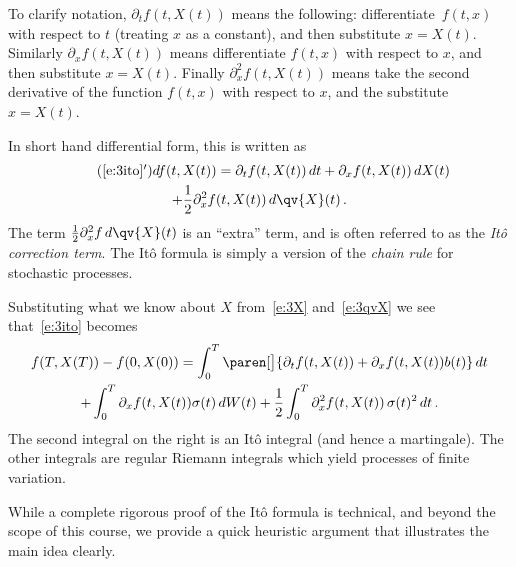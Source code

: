 \begin{remark}
  To clarify notation, $\partial_t f( t, X(t))$ means the following: differentiate~$f(t, x)$ with respect to $t$ (treating $x$ as a constant), and then substitute $x = X(t)$.
  Similarly $\partial_x f( t, X(t))$ means differentiate $f(t, x)$ with respect to $x$, and then substitute $x = X(t)$.
  Finally $\partial_x^2 f(t, X(t))$ means take the second derivative of the function $f(t, x)$ with respect to $x$, and the substitute $x = X(t)$.
\end{remark}
\begin{remark}
  In short hand differential form, this is written as
  \begin{multline}\label{e:3itoD}
    \tag{\ref{e:3ito}$'$}
    df(t, X(t)) = \partial_t f(t, X(t)) \, dt + \partial_x f(t, X(t)) \, dX(t)
    \\
      + \frac{1}{2} \partial_x^2 f(t, X(t)) \, d\qv{X}(t)\,.
  \end{multline}
  The term $\frac{1}{2} \partial_x^2 f \, d\qv{X}(t)$ is an ``extra'' term, and is often referred to as the \emph{It\^o correction term}.
  The It\^o formula is simply a version of the \emph{chain rule} for stochastic processes.
\end{remark}

\begin{remark}
  Substituting what we know about $X$ from~\eqref{e:3X} and~\eqref{e:3qvX} we see that~\eqref{e:3ito} becomes
  \begin{multline*}
    f(T, X(T)) - f(0, X(0))
      = \int_0^T \paren[\big]{ \partial_t f( t, X(t) )
	+ \partial_x f(t, X(t) ) b(t)} \, dt
    \\
      \mathbin+ \int_0^T \partial_x f(t, X(t)) \sigma(t) \, dW(t)
	+ \frac{1}{2} \int_0^T \partial_x^2 f(t, X(t)) \, \sigma(t)^2 \, dt\,.
  \end{multline*}
  The second integral on the right is an It\^o integral (and hence a martingale).
  The other integrals are regular Riemann integrals which yield processes of finite variation.
\end{remark}

While a complete rigorous proof of the It\^o formula is technical, and beyond the scope of this course, we provide a quick heuristic argument that illustrates the main idea clearly.

